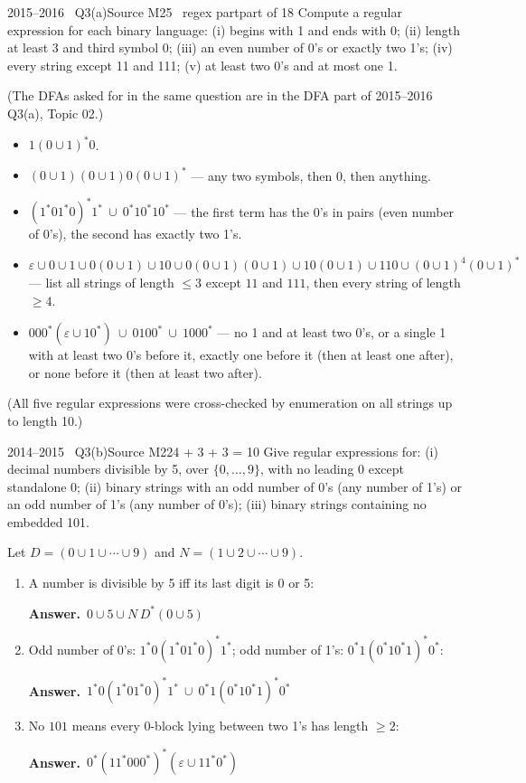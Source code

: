 \documentclass[11pt,a4paper]{article}
\newcommand{\eps}{\varepsilon}
\newcommand{\ans}[1]{\par\smallskip\noindent\colorbox{mist}{\parbox{\dimexpr\linewidth-2\fboxsep}{\sffamily\small\textbf{\color{teal}Answer.}\ \color{ink}#1}}\par}
\begin{document}
\begin{question}{2015--2016 \textbullet\ Q3(a)}{Source M25 \textbullet\ regex part}{part of 18}
Compute a regular expression for each binary language:
(i) begins with 1 and ends with 0;
(ii) length at least 3 and third symbol 0;
(iii) an even number of 0's or exactly two 1's;
(iv) every string except 11 and 111;
(v) at least two 0's and at most one 1.
\end{question}
\begin{solution}
(The DFAs asked for in the same question are in the DFA part of 2015--2016 Q3(a), Topic 02.)
\begin{itemize}
\item[(i)] $1(0\cup1)^*0$.
\item[(ii)] $(0\cup1)(0\cup1)0(0\cup1)^*$ --- any two symbols, then 0, then anything.
\item[(iii)] $(1^*01^*0)^*1^*\ \cup\ 0^*10^*10^*$ --- the first term has the 0's in pairs (even number of 0's), the second has exactly two 1's.
\item[(iv)] $\eps\cup0\cup1\cup0(0\cup1)\cup10\cup0(0\cup1)(0\cup1)\cup10(0\cup1)\cup110\cup(0\cup1)^4(0\cup1)^*$ --- list all strings of length $\le3$ except $11$ and $111$, then every string of length $\ge4$.
\item[(v)] $000^*(\eps\cup10^*)\ \cup\ 0100^*\ \cup\ 1000^*$ --- no 1 and at least two 0's, or a single 1 with at least two 0's before it, exactly one before it (then at least one after), or none before it (then at least two after).
\end{itemize}
(All five regular expressions were cross-checked by enumeration on all strings up to length 10.)
\end{solution}

\begin{question}{2014--2015 \textbullet\ Q3(b)}{Source M22}{4 + 3 + 3 = 10}
Give regular expressions for:
(i) decimal numbers divisible by 5, over $\{0,\dots,9\}$, with no leading 0 except standalone 0;
(ii) binary strings with an odd number of 0's (any number of 1's) or an odd number of 1's (any number of 0's);
(iii) binary strings containing no embedded 101.
\end{question}
\begin{solution}
Let $D=(0\cup1\cup\cdots\cup9)$ and $N=(1\cup2\cup\cdots\cup9)$.
\begin{enumerate}
\item A number is divisible by 5 iff its last digit is 0 or 5: \ans{$0\cup5\cup N\,D^*(0\cup5)$}
\item Odd number of 0's: $1^*0(1^*01^*0)^*1^*$; odd number of 1's: $0^*1(0^*10^*1)^*0^*$:
\ans{$1^*0(1^*01^*0)^*1^*\ \cup\ 0^*1(0^*10^*1)^*0^*$}
\item No $101$ means every 0-block lying between two 1's has length $\ge2$:
\ans{$0^*(11^*000^*)^*(\eps\cup11^*0^*)$}
\end{enumerate}
\end{solution}
\end{document}
